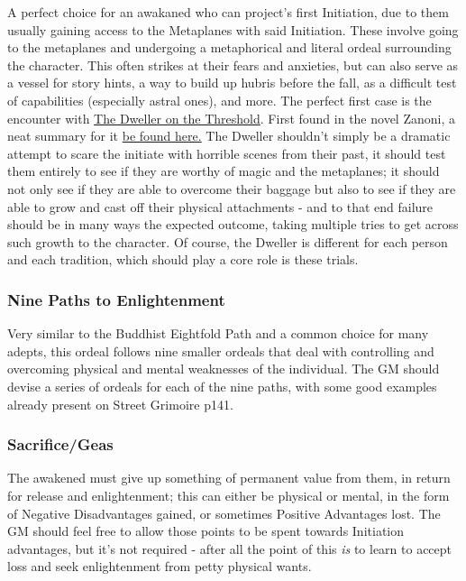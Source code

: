 \begin{multicols*}{3}
	A perfect choice for an awakaned who can project's first Initiation, due to them usually gaining access to the Metaplanes with said Initiation. These involve going to the metaplanes and undergoing a metaphorical and literal ordeal surrounding the character. This often strikes at their fears and anxieties, but can also serve as a vessel for story hints, a way to build up hubris before the fall, as a difficult test of capabilities (especially astral ones), and more. The perfect first case is the encounter with \textcolor{Blue}{\href{https://en.wikipedia.org/wiki/Guardian_of_the_Threshold}{The Dweller on the Threshold}}. First found in the novel Zanoni, a neat summary for it \textcolor{Blue}{\href{https://web.archive.org/web/20160402204637/http://www.andras-nagy.com/dweller.html}{be found here.}} The Dweller shouldn't simply be a dramatic attempt to scare the initiate with horrible scenes from their past, it should test them entirely to see if they are worthy of magic and the metaplanes; it should not only see if they are able to overcome their baggage but also to see if they are able to grow and cast off their physical attachments - and to that end failure should be in many ways the expected outcome, taking multiple tries to get across such growth to the character. Of course, the Dweller is different for each person and each tradition, which should play a core role is these trials.
	
	\subsubsection*{Nine Paths to Enlightenment}
	
	Very similar to the Buddhist Eightfold Path and a common choice for many adepts, this ordeal follows nine smaller ordeals that deal with controlling and overcoming physical and mental weaknesses of the individual. The GM should devise a series of ordeals for each of the nine paths, with some good examples already present on Street Grimoire p141.
	
	\subsubsection*{Sacrifice/Geas}
	
	The awakened must give up something of permanent value from them, in return for release and enlightenment; this can either be physical or mental, in the form of Negative Disadvantages gained, or sometimes Positive Advantages lost. The GM should feel free to allow those points to be spent towards Initiation advantages, but it's not required - after all the point of this \textit{is} to learn to accept loss and seek enlightenment from petty physical wants.
	

\end{multicols*}
